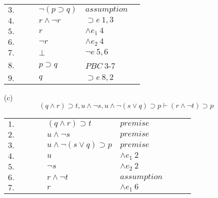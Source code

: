 \documentclass[12pt]{article}
\begin{document}
\begin{itemize}
\begin{table}[H]
\begin{tabular}{*6{l}}
			$3.$ &\multicolumn{1}{|c}{} & & $\neg (p \supset q)$ & $assumption$ &\multicolumn{1}{c|}{}\\
			
			$4.$ &\multicolumn{1}{|c}{} & & $r \land \neg r$ & $\supset e \ 1, 3$ &\multicolumn{1}{c|}{}\\
			
			$5.$ &\multicolumn{1}{|c}{} & & $r$ & $\land e_1 \ 4$ &\multicolumn{1}{c|}{}\\
			
			$6.$ &\multicolumn{1}{|c}{} & & $\neg r$ & $\land e_2 \ 4$ &\multicolumn{1}{c|}{}\\
			
			$7.$ &\multicolumn{1}{|c}{} & & $\bot$ & $\neg e \ 5, 6$ &\multicolumn{1}{c|}{}\\ \cline{2-6}
			
			$8.$ & & & $p \supset q$ & $PBC \ 3$-$7$ & \\
			
			$9.$ & & & $q$ & $\supset e \ 8, 2$ & \\
			
		
		\end{tabular}
		\end{table}
	
	
	
	\item[(c)]
		\[
			(q \land r) \supset t, u \land \neg s, u \land \neg (s \lor q) \supset p \vdash (r \land \neg t) \supset p
		\]
		\begin{table}[H]
		\centering
		\begin{tabular}{*9{l}}
			$1.$ & & & & $(q \land r) \supset t$ & $premise$ & & & \\
			
			$2.$ & & & & $u \land \neg s$ & $premise$ & & & \\
			
			$3.$ & & & & $u \land \neg (s \lor q) \supset p$ & $premise$ & & & \\
			
			$4.$ & & & & $u$ & $\land e_1 \ 2$ & & & \\
			
			$5.$ & & & & $\neg s$ & $\land e_2 \ 2$ & & & \\
			
			\cline{2-9}
			
			$6.$ &\multicolumn{1}{|c}{} & & & $r \land \neg t$ & $assumption$ & & &\multicolumn{1}{c|}{}\\
			
			$7.$ &\multicolumn{1}{|c}{} & & & $r$ & $\land e_1 \ 6$ & & &\multicolumn{1}{c|}{}\\
			

\end{tabular}
\end{table}
\end{itemize}
\end{document}
